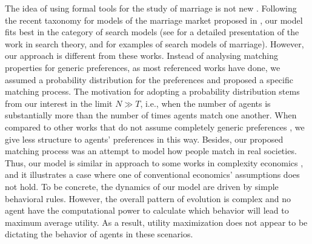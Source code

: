 \documentclass[12pt]{article}
\begin{document}


The idea of using formal tools for the study of marriage is not new \cite{10.2307/1831130,10.2307/1829987,10.2307/1837421}. Following the recent taxonomy for models of the marriage market proposed in \cite{doi:10.1146/annurev-economics-012320-121610}, our model fits best in the category of search models (see \cite{10.2307/23045893,10.1257/002205105775362014,doi:10.1146/annurev-economics-111809-125046,10.1257/jel.20150777} for a detailed presentation of the work in search theory, and  \cite{10.2307/2780247,10.2307/2951279,Burdett1999LongTermPF,10.2307/2999430,10.2307/44955185,RePEc:bpj:bejmac:v:advances.1:y:2001:i:1:n:5} for examples of search models of marriage). However, our approach is different from these works. Instead of analysing matching properties for generic preferences, as most referenced works have done, we assumed a probability distribution for the preferences and proposed a specific matching process. The motivation for adopting a probability distribution stems from our interest in the limit $N\gg T$, i.e., when the number of agents is substantially more than the number of times agents match one another. When compared to other works that do not assume completely generic preferences \cite{doi:10.1086/689869,10.1093/restud/rdw041}, we give less structure to agents' preferences in this way. Besides, our proposed matching process was an attempt to model how people match in real societies. Thus, our model is similar in approach to some works in complexity economics \cite{comecon,10.5555/547051}, and it illustrates a case where one of conventional economics' assumptions does not hold. To be concrete, the dynamics of our model are driven by simple behavioral rules. However, the overall pattern of evolution is complex and no agent have the computational power to calculate which behavior will lead to maximum average utility. As a result, utility maximization does not appear to be dictating the behavior of agents in these scenarios.
\end{document}
